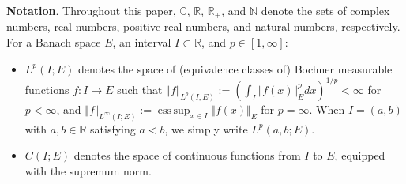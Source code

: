 \documentclass[onecolumn]{autart}
\def\R{{\mathbb{R}}}
\def\R{\mathbb R}
\def\C{\mathbb C}
\def\N{\mathbb N}
\numberwithin{equation}{section}
\begin{document}



	{\bf Notation}. Throughout this paper, $\C$, $\R$, $\R_+$, and $\N$ denote the sets of complex numbers, real numbers, positive real numbers, and natural numbers, respectively.  For a Banach space $E$, an interval $I \subset \R$, and $p \in [1,\infty]${:}
	\begin{itemize}
		\item  ${L}^p(I;E)$ denotes the space of (equivalence classes of) Bochner measurable functions $f \colon I \to E$ such that $	\Vert f\Vert_{{ L}^p(I;E)} := \left(\int_I \Vert f(x)\Vert_E^{p}dx\right)^{1/p} <\infty$ for $p<\infty$,
		and $ \Vert f\Vert_{{ L}^\infty(I;E)}:= \operatorname{ess\,sup}_{x\in I} \Vert f(x)\Vert_E$ for $p=\infty$. When $I =(a,b)$ with $a,b\in\mathbb{R}$ satisfying  $a<b$, we simply write ${ L}^p(a,b;E)$.
		\item  ${C}(I; E)$ denotes the space of continuous functions from $I$ to $E$, equipped with the supremum norm.
	\end{itemize}
	
\end{document}

